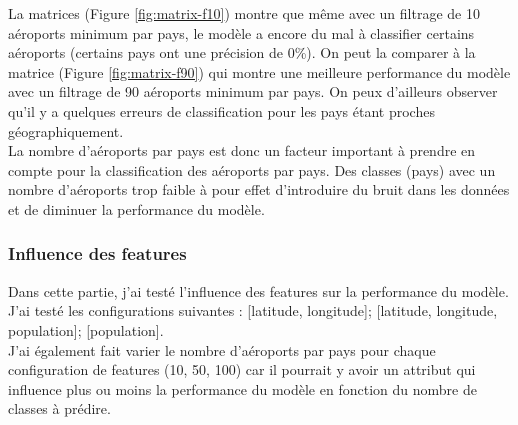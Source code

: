 La matrices (Figure \ref{fig:matrix-f10}) montre que même avec un filtrage de
10 aéroports minimum par pays, le modèle a encore du mal à classifier certains
aéroports (certains pays ont une précision de 0\%). On peut la comparer à la
matrice (Figure \ref{fig:matrix-f90}) qui montre une meilleure performance du
modèle avec un filtrage de 90 aéroports minimum par pays. On peux d'ailleurs
observer qu'il y a quelques erreurs de classification pour les pays étant
proches géographiquement.\\

La nombre d'aéroports par pays est donc un facteur important à prendre en
compte pour la classification des aéroports par pays. Des classes (pays) avec
un nombre d'aéroports trop faible à pour effet d'introduire du bruit dans les
données et de diminuer la performance du modèle.\\

\subsubsection{Influence des features}

Dans cette partie, j'ai testé l'influence des features sur la performance du
modèle.\\ J'ai testé les configurations suivantes : [latitude, longitude];
[latitude, longitude, population]; [population].\\ J'ai également fait varier
le nombre d'aéroports par pays pour chaque configuration de features (10, 50,
100) car il pourrait y avoir un attribut qui influence plus ou moins la
performance du modèle en fonction du nombre de classes à prédire.\\

